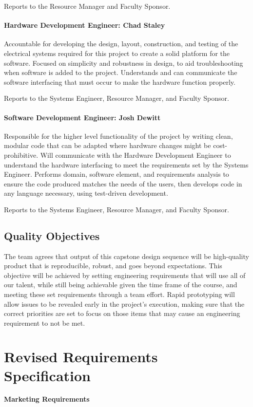 Reports to the Resource Manager and Faculty Sponsor.

\paragraph{Hardware Development Engineer: Chad Staley}
Accountable for developing the design, layout, construction, and testing of the electrical systems required for this project to create a solid platform for the software.
Focused on simplicity and robustness in design, to aid troubleshooting when software is added to the project.
Understands and can communicate the software interfacing that must occur to make the hardware function properly.

Reports to the Systems Engineer, Resource Manager, and Faculty Sponsor. 

\paragraph{Software Development Engineer: Josh Dewitt}
Responsible for the higher level functionality of the project by writing clean, modular code that can be adapted where hardware changes might be cost-prohibitive.
Will communicate with the Hardware Development Engineer to understand the hardware interfacing to meet the requirements set by the Systems Engineer.
Performs domain, software element, and requirements analysis to ensure the code produced matches the needs of the users, then develops code in any language necessary, using test­-driven development.

Reports to the Systems Engineer, Resource Manager, and Faculty Sponsor.

\subsection{Quality Objectives}
The team agrees that output of this capstone design sequence will be high-quality product that is reproducible, robust, and goes beyond expectations.
This objective will be achieved by setting engineering requirements that will use all of our talent, while still being achievable given the time frame of the course, and meeting these set requirements through a team effort.
Rapid prototyping will allow issues to be revealed early in the project's execution, making sure that the correct priorities are set to focus on those items that may cause an engineering requirement to not be met.

\section{Revised Requirements Specification}
\textbf{Marketing Requirements}

